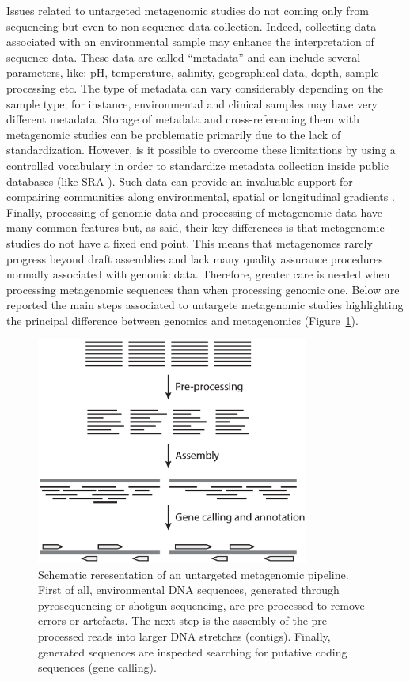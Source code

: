Issues related to untargeted metagenomic studies do not coming only from sequencing but even to non-sequence data collection. Indeed, collecting data associated with an environmental sample may enhance the interpretation of sequence data. These data are called ``metadata'' and can include several parameters, like: pH, temperature, salinity, geographical data, depth, sample processing etc. The type of metadata can vary considerably depending on the sample type; for instance, environmental and clinical samples may have very different metadata. Storage of metadata and cross-referencing them with metagenomic studies can be problematic primarily due to the lack of standardization. However, is it possible to overcome these limitations by using a controlled vocabulary in order to standardize metadata collection inside public databases (like SRA \cite{kodama2012sequence}). Such data can provide an invaluable support for compairing communities along environmental, spatial or longitudinal gradients \cite{erkel2006genome}.\\
Finally, processing of genomic data and processing of metagenomic data have many common features but, as said, their key differences is that metagenomic studies do not have a fixed end point. This means that metagenomes rarely progress beyond draft assemblies and lack many quality assurance procedures normally associated with genomic data. Therefore, greater care is needed when processing metagenomic sequences than when processing genomic one. Below are reported the main steps associated to untargete metagenomic studies highlighting the principal difference between genomics and metagenomics (Figure~\ref{fig:untrapipe}).\\%
\begin{figure}[!tb]
	\centering
	\includegraphics[width=0.8\textwidth]{./figures/Introduction/metagen_pipe_mod}
  	\caption{Schematic reresentation of an untargeted metagenomic pipeline. First of all, environmental DNA sequences, generated through pyrosequencing or shotgun sequencing, are pre-processed to remove errors or artefacts. The next step is the assembly of the pre-processed reads into larger DNA stretches (contigs). Finally, generated sequences are inspected searching for putative coding sequences (gene calling).\label{fig:untrapipe}}
\end{figure}%

